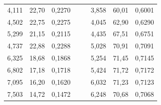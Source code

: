 \begin{enumerate}
\begin{table}[h!]
\begin{tabular}{ccccc|lll|}
				\multicolumn{1}{|c|}{4,111}                     & \multicolumn{1}{c|}{22,70}                     & \multicolumn{1}{c|}{0,2270}     &  &  & \multicolumn{1}{l|}{3,858}                     & \multicolumn{1}{l|}{60,01}                    & 0,6001                         \\ \cline{1-3} \cline{6-8} 
				\multicolumn{1}{|c|}{4,502}                     & \multicolumn{1}{c|}{22,75}                    & \multicolumn{1}{c|}{0,2275}    &  &  & \multicolumn{1}{l|}{4,045}                     & \multicolumn{1}{l|}{62,90}                     & 0,6290                          \\ \cline{1-3} \cline{6-8} 
				\multicolumn{1}{|c|}{5,299}                     & \multicolumn{1}{c|}{21,15}                    & \multicolumn{1}{c|}{0,2115}    &  &  & \multicolumn{1}{l|}{4,435}                     & \multicolumn{1}{l|}{67,51}                    & 0,6751                         \\ \cline{1-3} \cline{6-8} 
				\multicolumn{1}{|c|}{4,737}                     & \multicolumn{1}{c|}{22,88}                    & \multicolumn{1}{c|}{0,2288}    &  &  & \multicolumn{1}{l|}{5,028}                     & \multicolumn{1}{l|}{70,91}                    & 0,7091                         \\ \cline{1-3} \cline{6-8} 
				\multicolumn{1}{|c|}{6,325}                     & \multicolumn{1}{c|}{18,68}                    & \multicolumn{1}{c|}{0,1868}    &  &  & \multicolumn{1}{l|}{5,254}                     & \multicolumn{1}{l|}{71,45}                    & 0,7145                         \\ \cline{1-3} \cline{6-8} 
				\multicolumn{1}{|c|}{6,802}                     & \multicolumn{1}{c|}{17,18}                    & \multicolumn{1}{c|}{0,1718}    &  &  & \multicolumn{1}{l|}{5,424}                     & \multicolumn{1}{l|}{71,72}                    & 0,7172                         \\ \cline{1-3} \cline{6-8} 
				\multicolumn{1}{|c|}{7,095}                     & \multicolumn{1}{c|}{16,20}                     & \multicolumn{1}{c|}{0,1620}     &  &  & \multicolumn{1}{l|}{6,032}                     & \multicolumn{1}{l|}{71,23}                    & 0,7123                         \\ \cline{1-3} \cline{6-8} 
				\multicolumn{1}{|c|}{7,503}                     & \multicolumn{1}{c|}{14,72}                    & \multicolumn{1}{c|}{0,1472}    &  &  & \multicolumn{1}{l|}{6,248}                     & \multicolumn{1}{l|}{70,68}                    & 0,7068                         \\ \cline{1-3} \cline{6-8} 

\end{tabular}
\end{table}
\end{enumerate}
